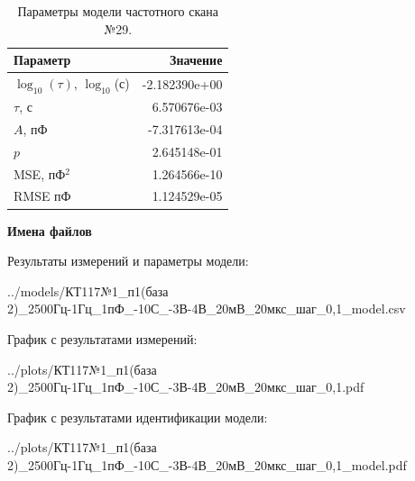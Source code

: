 \begin{table}[!ht]
    \centering
    \caption{Параметры модели частотного скана №29.}
    \begin{tabular}{|l|r|}
        \hline
        Параметр                                       & Значение                  \\ \hline
        $\log_{10}(\tau)$, $\log_{10}$(с)              & -2.182390e+00             \\ \hline
        $\tau$, с                                      & 6.570676e-03              \\ \hline
        $A$, пФ                                        & -7.317613e-04             \\ \hline
        $p$                                            & 2.645148e-01              \\ \hline
        MSE, пФ$^2$                                    & 1.264566e-10              \\ \hline
        RMSE пФ                                        & 1.124529e-05              \\ \hline
    \end{tabular}
    \label{table:frequency_scan_model_29}
\end{table}

\textbf{Имена файлов}

Результаты измерений и параметры модели:

\scriptsize../models/КТ117№1\_п1(база 2)\_2500Гц-1Гц\_1пФ\_-10С\_-3В-4В\_20мВ\_20мкс\_шаг\_0,1\_model.csv
\normalsize

График с результатами измерений:

\scriptsize../plots/КТ117№1\_п1(база 2)\_2500Гц-1Гц\_1пФ\_-10С\_-3В-4В\_20мВ\_20мкс\_шаг\_0,1.pdf
\normalsize

График с результатами идентификации модели:

\scriptsize../plots/КТ117№1\_п1(база 2)\_2500Гц-1Гц\_1пФ\_-10С\_-3В-4В\_20мВ\_20мкс\_шаг\_0,1\_model.pdf
\normalsize

